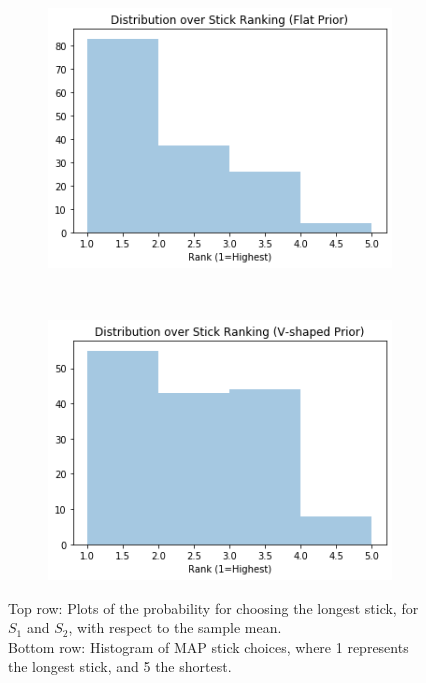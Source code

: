 \documentclass[10pt,letterpaper]{article}
\begin{document}
\begin{figure}[h]
\begin{subfigure}{0.45\textwidth}
	\includegraphics[width=\textwidth]{figures/see_histFlat.png}
\end{subfigure}
~
\begin{subfigure}{0.45\textwidth}
	\includegraphics[width=\textwidth]{figures/see_histV.png}
\end{subfigure}
\caption{Top row: Plots of the probability for choosing the longest stick, for $S_1$ and $S_2$, with respect to the sample mean.
\\
Bottom row: Histogram of MAP stick choices, where 1 represents the longest stick, and 5 the shortest.} 
\label{fig:seeSpeaker}
\end{figure}
\end{document}
